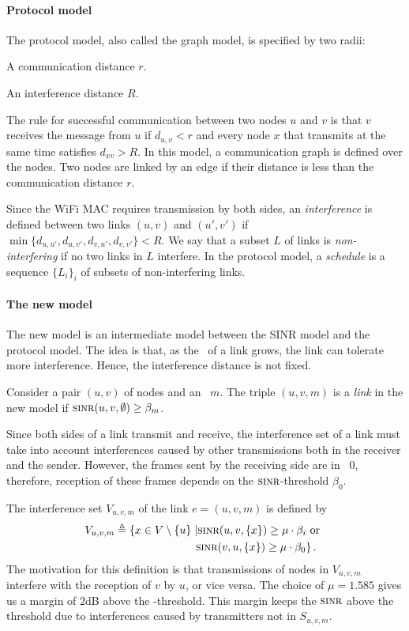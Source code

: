 \documentclass[12pt]{article}
\newenvironment{proof sketch}[1]{\noindent {\emph{Proof sketch of #1:}}}{\hfill \qed}
\newcommand{\eqdf}{\triangleq}
\newcommand{\SINR}{\text{\sc{sinr}}}
\newcommand{\SNR}{\text{\sc{snr}}}
\newcommand{\MCS}{\text{\sc{mcs}}}
\begin{document}
\paragraph{Protocol model}
The protocol model, also called the graph model, is specified by two
radii:
\begin{inparaenum}[(i)]
\item A communication distance $r$.
\item An interference distance $R$.
\end{inparaenum}
The rule for successful communication between two nodes $u$ and $v$ is
that $v$ receives the message from $u$ if $d_{u,v}<r$ and every node
$x$ that transmits at the same time satisfies $d_{xv}> R$.  In this
model, a communication graph is defined over the nodes.  Two nodes are
linked by an edge if their distance is less than the communication
distance $r$.

Since the WiFi MAC requires transmission by both sides, an
\emph{interference} is defined between two links $(u,v)$ and $(u',v')$
if $\min\{d_{u,u'},d_{u,v'}, d_{v,u'}, d_{v,v'}\} < R$.  We say that a
subset $L$ of links is \emph{non-interfering} if no two links in $L$
interfere.  In the protocol model, a \emph{schedule} is a sequence
$\{L_i\}_i$ of subsets of non-interfering links.


\paragraph{The new model}
The new model is an intermediate model between the SINR model and the
protocol model. The idea is that, as the \SNR\ of a link grows, the
link can tolerate more interference. Hence, the interference distance
is not fixed.

Consider a pair $(u,v)$ of nodes and an \MCS\ $m$.
The triple $(u,v,m)$ is a \emph{link} in the new model if
$\SINR(u,v,\emptyset) \geq \beta_m$.

Since both sides of a link transmit and receive, the interference set
of a link must take into account interferences caused by other
transmissions both in the receiver and the sender. However, the frames
sent by the receiving side are in \MCS\ $0$, therefore, reception of
these frames depends on the $\SINR$-threshold $\beta_0$.

The interference set $V_{u,v,m}$ of the link $e=(u,v,m)$ is defined by
  \begin{align*}
    V_{u,v,m} \eqdf \left\{ x \in V \setminus\{u\}\right. &\left | \SINR(u,v,\{x\}) \geq \mu  \cdot \beta_i \text{ or } \right. \\
    & \left.\SINR(v,u,\{x\}) \geq \mu \cdot \beta_0\right\}.
\end{align*}
The motivation for this definition is that transmissions of nodes in $V_{u,v,m}$ interfere with
the reception of $v$ by $u$, or vice versa.
The choice of $\mu=1.585$ gives us a margin of $2$dB above the
\SINR-threshold.  This margin keeps the $\SINR$ above the threshold
due to interferences caused by transmitters not in $S_{u,v,m}$.
\end{document}
